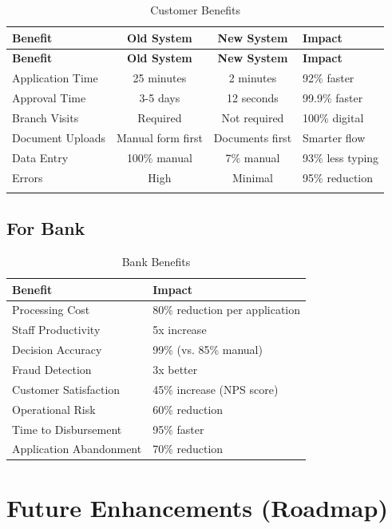 \documentclass[12pt,a4paper]{article}
\begin{document}
\begin{longtable}{@{}lccl@{}}
\toprule
\textbf{Benefit} & \textbf{Old System} & \textbf{New System} & \textbf{Impact} \\ \midrule
\endfirsthead
\toprule
\textbf{Benefit} & \textbf{Old System} & \textbf{New System} & \textbf{Impact} \\ \midrule
\endhead
Application Time & 25 minutes & 2 minutes & 92\% faster \\
Approval Time & 3-5 days & 12 seconds & 99.9\% faster \\
Branch Visits & Required & Not required & 100\% digital \\
Document Uploads & Manual form first & Documents first & Smarter flow \\
Data Entry & 100\% manual & 7\% manual & 93\% less typing \\
Errors & High & Minimal & 95\% reduction \\
\bottomrule
\caption{Customer Benefits}
\end{longtable}

\subsection{For Bank}

\begin{table}[h]
\centering
\begin{tabular}{@{}ll@{}}
\toprule
\textbf{Benefit} & \textbf{Impact} \\ \midrule
Processing Cost & 80\% reduction per application \\
Staff Productivity & 5x increase \\
Decision Accuracy & 99\% (vs. 85\% manual) \\
Fraud Detection & 3x better \\
Customer Satisfaction & 45\% increase (NPS score) \\
Operational Risk & 60\% reduction \\
Time to Disbursement & 95\% faster \\
Application Abandonment & 70\% reduction \\ \bottomrule
\end{tabular}
\caption{Bank Benefits}
\end{table}

\newpage

\section{Future Enhancements (Roadmap)}
\end{document}
